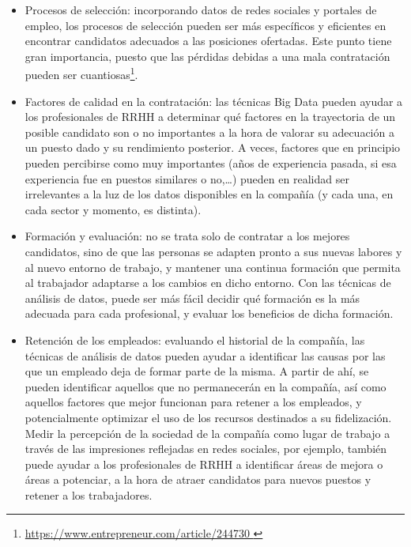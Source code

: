\begin{itemize}
\item \label{item:puntodeproyecto} Procesos de selección: incorporando datos de redes sociales y portales de empleo,
los procesos de selección pueden ser más específicos y eficientes en encontrar candidatos 
adecuados a las posiciones ofertadas. Este punto tiene gran importancia, puesto que
las pérdidas debidas a una mala contratación pueden ser cuantiosas\footnote{\url{https://www.entrepreneur.com/article/244730 }}.
\label{item:puntodeproyecto}

\item Factores de calidad en la contratación: las técnicas Big Data pueden ayudar a los profesionales de
RRHH a determinar qué factores en la trayectoria de un posible candidato son o no importantes a 
la hora de valorar su adecuación a un puesto dado y su rendimiento posterior. A veces, factores que
en principio pueden percibirse como muy importantes (años de experiencia pasada, si esa experiencia fue
en puestos similares o no,\dots) pueden en realidad ser irrelevantes a la luz de los datos disponibles
en la compañía (y cada una, en cada sector y momento, es distinta).

\item Formación y evaluación: no se trata solo de contratar a los mejores candidatos, sino
de que las personas se adapten pronto a sus nuevas labores y al nuevo entorno de trabajo,
y mantener una continua formación que permita al trabajador adaptarse a los cambios en dicho
entorno. Con las técnicas de análisis de datos, puede ser más fácil decidir qué formación es 
la más adecuada para cada profesional, y evaluar los beneficios de dicha formación.

\item Retención de los empleados: evaluando el historial de la compañía,
las técnicas de análisis de datos pueden ayudar a identificar las causas por las que un empleado
deja de formar parte de la misma. A partir de ahí, se pueden identificar aquellos que no 
permanecerán en la compañía, así como aquellos factores que mejor funcionan para retener a los empleados,
y potencialmente optimizar el uso de los recursos destinados a su fidelización. 
Medir la percepción de la sociedad de la compañía como lugar de trabajo a través de las impresiones
reflejadas en redes sociales, por ejemplo, también puede ayudar a los profesionales de RRHH a
identificar áreas de mejora o áreas a potenciar,
a la hora de atraer candidatos para nuevos puestos y retener a los trabajadores.


\end{itemize}
